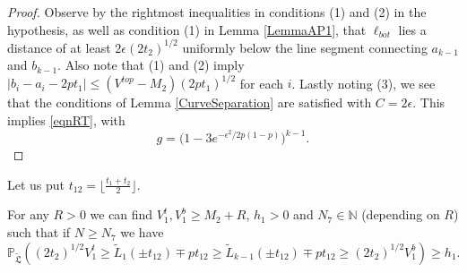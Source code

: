 \begin{proof}
	
	Observe by the rightmost inequalities in conditions (1) and (2) in the hypothesis, as well as condition (1) in Lemma \ref{LemmaAP1}, that $\ell_{bot}$ lies a distance of at least $2\epsilon(2t_2)^{1/2}$ uniformly below the line segment connecting $a_{k-1}$ and $b_{k-1}$. Also note that (1) and (2) imply $|b_i-a_i-2pt_1| \leq (V^{top} - M_2)(2pt_1)^{1/2}$ for each $i$. Lastly noting (3), we see that the conditions of Lemma \ref{CurveSeparation} are satisfied with $C = 2\epsilon$. This implies \eqref{eqnRT}, with
	\[
	g = \big(1 - 3e^{-\epsilon^2/2p(1-p)}\big)^{k-1}.
	\]
	
\end{proof}

Let us put $t_{12} = \lfloor \frac{t_1 + t_2}{2} \rfloor$.

\begin{lemma}\label{LemmaBP2} For any $R > 0$ we can find $V_1^t, V_1^b \geq M_2 + R$, $h_1 > 0$ and $N_7 \in \mathbb{N}$ (depending on $R$) such that if $N \geq N_7$ we have
	\begin{equation}\label{eqnRT2}
	\mathbb{P}_{\tilde{\mathfrak{L}}} \left(  (2t_2)^{1/2} V_1^t \geq \tilde{L}_1(\pm t_{12}) \mp p t_{12} \geq \tilde{L}_{k-1}(\pm t_{12}) \mp p t_{12} \geq (2t_2)^{1/2} V_1^b  \right) \geq h_1.
	\end{equation}
	
\end{lemma}

